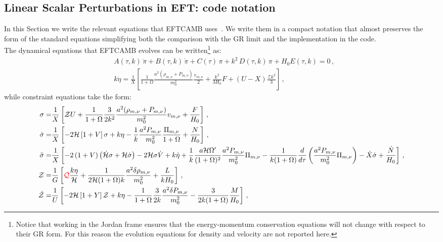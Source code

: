 \documentclass[prd,nofootinbib,showpacs]{revtex4}
\def\l{\left}
\def\r{\right}
\def\f{\frac}
\def\hub{{\mathcal H}}
\begin{document}
{\subsection{Linear Scalar Perturbations in EFT: code notation} \label{SubSec:EFTPe}
%
In this Section we write the relevant equations that EFTCAMB uses~\cite{Ma:1995ey}. We write them in a compact notation that almost preserves the form of the standard equations simplifying both the comparison with the GR limit and the implementation in the code. \\
The dynamical equations that EFTCAMB evolves can be written\footnote{Notice that working in the Jordan frame ensures that the energy-momentum conservation equations 
will not change with respect to their GR form. For this reason the evolution equations for density and velocity are not reported here.} as:
%
\begin{align}
& A(\tau,k)\,\ddot{\pi} + B(\tau,k)\,\dot{\pi} + C(\tau)\,\pi + k^2\,D(\tau,k)\,\pi + H_0 E(\tau,k) =0 \label{Eq:PiFieldEquation} \,,\\
& k\dot{\eta} = \f{1}{X}\l[\frac{1}{1+\Omega} \frac{a^2(\rho_{m,\nu}+P_{m,\nu})}{m_0^2}\frac{v_{m,\nu}}{2} + \frac{k^2}{3H_0}F +(U-X)\f{\mathcal{Z}k^2}{3}\r]   \label{Eq:EtaEquation}\,,
\end{align}
%
while constraint equations take the form:
%
\begin{align}
\sigma =&\f{1}{X}\l[ \mathcal{Z}U + \frac{1}{1+\Omega}\frac{3}{2k^2}\frac{a^2(\rho_{m,\nu}+P_{m,\nu})}{m_0^2}v_{m,\nu} + \frac{{F}}{H_0}\r] \label{Eq:SigmaEquation}\,,\\
%
\dot{\sigma} =&\f{1}{X}\l[ -2\mathcal{H}\l[1+V\r]\sigma  + k \eta-\frac{1}{k}\frac{a^2P_{m,\nu}}{m_0^2}\frac{\Pi_{m,\nu}}{1+\Omega} +\f{N}{H_0}\r] \label{Eq:SigmadotEquation}\,,\\
%
\ddot{\sigma} =& \f{1}{X}\l[ -2\l(1+V \r)\l(\dot{\mathcal{H}}\sigma +\hub \dot{\sigma} \r) -2\hub \sigma \dot{V} +k \dot{\eta} +\frac{1}{k}\frac{a \mathcal{H} \Omega^\prime}{(1+\Omega)^2}\frac{a^2P_{m,\nu}}{m_0^2}\Pi_{m,\nu} -\frac{1}{k(1+\Omega)}\frac{d}{d\tau}\left(\frac{a^2P_{m,\nu}}{m_0^2}\Pi_{m,\nu} \right)-\dot{{X}}\dot{\sigma} +\f{\dot{N}}{H_0}\r] \label{Eq:SigmadotdotEquation}\,,\\
%
\mathcal{Z} =& \f{1}{G}\l[\textcolor{red}{\mathcal{Q}}\frac{k\eta}{\mathcal{H}} + \frac{1}{2\mathcal{H}(1+\Omega)k}\frac{a^2 \delta\rho_{m,\nu}}{m_0^2} + \frac{{L}}{kH_0} \r] \label{Eq:Zequation}\,,\\
%
\dot{\mathcal{Z}} =&\f{1}{U}\l[ -2 \mathcal{H} \l[1 + Y\r] \mathcal{Z} + k\eta -\frac{1}{1+\Omega}\frac{3}{2k}\frac{a^2\delta P_{m,\nu}}{m_0^2} - \frac{3}{2k(1+\Omega)}\frac{{M}}{H_0}\r] \,,\nonumber \\

\end{align}}
\end{document}
